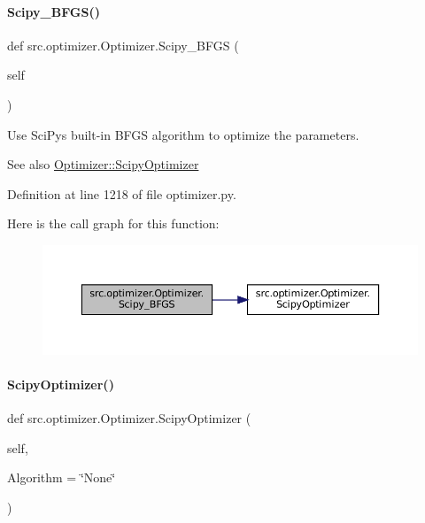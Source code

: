 \paragraph{\texorpdfstring{Scipy\+\_\+\+B\+F\+G\+S()}{Scipy\_BFGS()}}
{\footnotesize\ttfamily def src.\+optimizer.\+Optimizer.\+Scipy\+\_\+\+B\+F\+GS (\begin{DoxyParamCaption}\item[{}]{self }\end{DoxyParamCaption})}



Use Sci\+Py\textquotesingle{}s built-\/in B\+F\+GS algorithm to optimize the parameters. 

\begin{DoxySeeAlso}{See also}
\hyperlink{classsrc_1_1optimizer_1_1Optimizer_a1e616a4c920b3e8935ca19e208b1c3be}{Optimizer\+::\+Scipy\+Optimizer} 
\end{DoxySeeAlso}


Definition at line 1218 of file optimizer.\+py.

Here is the call graph for this function\+:
\nopagebreak
\begin{figure}[H]
\begin{center}
\leavevmode
\includegraphics[width=350pt]{classsrc_1_1optimizer_1_1Optimizer_aff37f4cc60afa2eced61c258e4eed859_cgraph}
\end{center}
\end{figure}
\mbox{\label{classsrc_1_1optimizer_1_1Optimizer_a1e616a4c920b3e8935ca19e208b1c3be}} 
\paragraph{\texorpdfstring{Scipy\+Optimizer()}{ScipyOptimizer()}}
{\footnotesize\ttfamily def src.\+optimizer.\+Optimizer.\+Scipy\+Optimizer (\begin{DoxyParamCaption}\item[{}]{self,  }\item[{}]{Algorithm = {\ttfamily \char`\"{}None\char`\"{}} }\end{DoxyParamCaption})}



